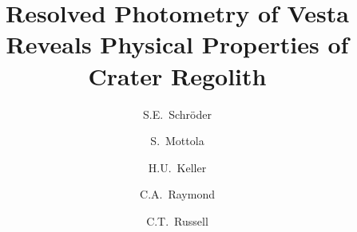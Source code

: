 \documentclass[3p,authoryear]{elsarticle}
\begin{document}
\begin{frontmatter}



\title{Resolved Photometry of Vesta Reveals Physical Properties of Crater Regolith}

\author[DLR]{S.E.~Schr\"oder}
\author[DLR]{S.~Mottola}
\author[IGEP]{H.U.~Keller}
\author[JPL]{C.A.~Raymond}
\author[UCLA]{C.T.~Russell}

\address[DLR]{Deutsches Zentrum f\"ur Luft- und Raumfahrt (DLR), 12489 Berlin, Germany}
\address[IGEP]{Institut f\"ur Geophysik und Extraterrestrische Physik (IGEP), Technische Universit\"at Braunschweig, 38106 Braunschweig, Germany}
\address[JPL]{Jet Propulsion Laboratory (JPL), California Institute of Technology, Pasadena, CA 91109, U.S.A.}
\address[UCLA]{Institute of Geophysics and Planetary Physics (IGPP), University of California, Los Angeles, CA 90095-1567, U.S.A.}

\begin{abstract}


\end{abstract}
\end{frontmatter}
\end{document}
